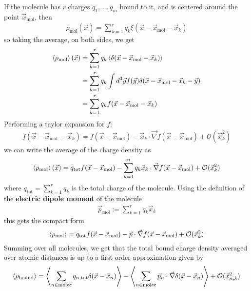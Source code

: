 If the molecule has $r$ charges $q_1, \ldots, q_m$ bound to it, and is centered around the point $\vec{x}_{\text{mol}}$, then 
\begin{align*}
  \rho_{\text{mol}}(\vec{x}) = \sum_{k = 1}^{r} q_{k} \xi(\vec{x} - \vec{x}_{\text{mol}} - \vec{x}_k )
\end{align*}
so taking the average, on both sides, we get 
\begin{align*}
  \left\langle\rho_{\text{mol}}\right\rangle(\vec{x}) 
  &= \sum_{k=1}^{r} q_k\left\langle\delta(\vec{x} - \vec{x}_{\text{mol}} - \vec{x}_k)\right\rangle\\
  &= \sum_{k=1}^{r} q_k \int d^{3} \vec{y} f(\vec{y}) \delta(\vec{x} - \vec{x}_{\text{mol}} - \vec{x}_{k} - \vec{y})\\
  &=
  \sum_{k=1}^{r} q_k f(\vec{x} - \vec{x}_{\text{mol}} - \vec{x}_k)
\end{align*}
Performing a taylor expansion for $f$:
\begin{align*}
  f(\vec{x} - \vec{x}_{\text{mol.}} - \vec{x}_k) = f(\vec{x} - \vec{x}_{\text{mol}}) - \vec{x}_k \cdot \vec{\nabla} f(\vec{x} - \vec{x}_{\text{mol}}) + \mathcal{O}(\vec{x}_k^{2})
\end{align*}
we can write the average of the charge density as
\begin{align*}
  \left\langle
    \rho_{\text{mol}}
  \right\rangle
  (\vec{x}) 
  = q_{\text{tot}}f(\vec{x} - \vec{x}_{\text{mol}}) - \sum_{k=1}^{n}q_k \vec{x}_k \cdot \vec{\nabla}f(\vec{x} - \vec{x}_{\text{mol}}) + \mathcal{O}(\vec{x}_k^{2})
\end{align*}
where $q_{\text{tot}} = \sum_{k=1}^{r} q_k$ is the total charge of the molecule.
Using the definition of the \textbf{electric dipole moment} of the molecule
\begin{align*}
  \vec{p}_{\text{mol}} := \sum_{k=1}^{r} q_k \vec{x}_k
\end{align*}
this gets the compact form
\begin{align*}
  \left\langle\rho_{\text{mol}}\right\rangle = q_{\text{tot}} f(\vec{x} - \vec{x}_{\text{mol}}) - \vec{p} \cdot \vec{\nabla}f(\vec{x} - \vec{x}_{\text{mol}}) + \mathcal{O}(\vec{x}_k^{2})
\end{align*}
Summing over all molecules,
we get that the total bound charge density averaged over atomic distances is up to a first order approximation given by
\begin{align*}
  \left\langle\rho_{\text{bound}}\right\rangle 
= 
\left\langle
  \sum_{n \in \text{molec}}q_{n,\text{tot}} \delta(\vec{x} - \vec{x}_n)
\right\rangle
- 
  \left\langle
    \sum_{n \in \text{molec}}
    \vec{p}_n \cdot \vec{\nabla} \delta(\vec{x}- \vec{x}_n)
  \right\rangle
  + \mathcal{O}(\vec{x}_{n,k}^{2})
\end{align*}
